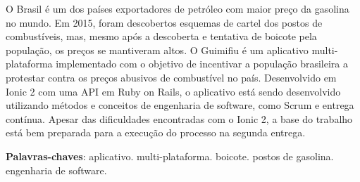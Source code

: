 \begin{resumo}

O Brasil é um dos países exportadores de petróleo com maior preço da gasolina no mundo. Em 2015, foram descobertos esquemas de cartel dos postos de combustíveis, mas, mesmo após a descoberta e tentativa de boicote pela população, os preços se mantiveram altos. O Guimifiu é um aplicativo multi-plataforma implementado com o objetivo de incentivar a população brasileira a protestar contra os preços abusivos de combustível no país. Desenvolvido em Ionic 2 com uma API em Ruby on Rails, o aplicativo está sendo desenvolvido utilizando métodos e conceitos de engenharia de software, como Scrum e entrega contínua. Apesar das dificuldades encontradas com o Ionic 2, a base do trabalho está bem preparada para a execução do processo na segunda entrega.

 \vspace{\onelineskip}
    
 \noindent
 \textbf{Palavras-chaves}: aplicativo. multi-plataforma. boicote. postos de gasolina. engenharia de software. 
\end{resumo}
